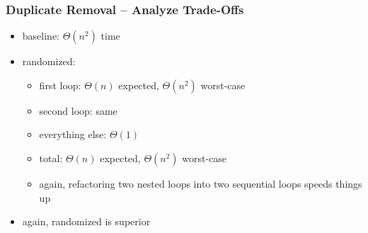 \documentclass[10pt]{beamer}
\begin{document}
\begin{frame} \frametitle{Duplicate Removal -- Analyze Trade-Offs}
  \begin{itemize}
    \item baseline: $\Theta(n^2)$ time
    \item randomized:
      \begin{itemize}
        \item first loop: $\Theta(n)$ expected, $\Theta(n^2)$ worst-case
        \item second loop: same
        \item everything else: $\Theta(1)$
        \item total: $\Theta(n)$ expected, $\Theta(n^2)$ worst-case
        \item again, refactoring two nested loops into two sequential loops speeds things up
      \end{itemize}
    \item again, randomized is superior
  \end{itemize}
\end{frame}
\end{document}
